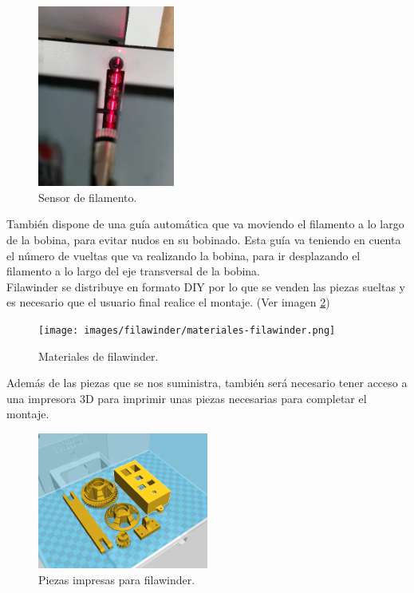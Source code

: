     \begin{figure}[H]
            \centering
            \includegraphics[width=0.4\textwidth]{images/filawinder/Sensor-filamento.jpg}
            \caption{Sensor de filamento.}
            \label{fig:winder_sensor}
    \end{figure}

También dispone de una guía automática que va moviendo el filamento a lo largo de la bobina, para evitar nudos en su bobinado. Esta guía va teniendo en cuenta el número de vueltas que va realizando la bobina, para ir desplazando el filamento a lo largo del eje transversal de la bobina.\\

Filawinder se distribuye en formato DIY por lo que se venden las piezas sueltas y es necesario que el usuario final realice el montaje. (Ver imagen \ref{fig:winder_material})
    \begin{figure}[H]
            \centering
            \texttt{[image: images/filawinder/materiales-filawinder.png]}
            \caption{Materiales de filawinder.}
            \label{fig:winder_material}
    \end{figure}

Además de las piezas que se nos suministra, también será necesario tener acceso a una impresora 3D para imprimir unas piezas necesarias para completar el montaje.

    \begin{figure}[H]
            \centering
            \includegraphics[width=0.5\textwidth]{images/filawinder/piezas-impresas.png}
            \caption{Piezas impresas para filawinder.}
            \label{fig:winder_piezas}
    \end{figure}

